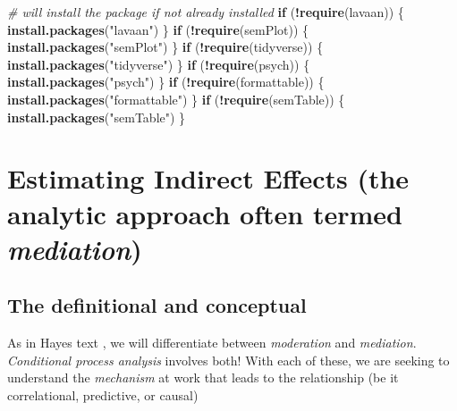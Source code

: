 \documentclass[
  11pt,
]{book}
\newenvironment{Shaded}{\begin{snugshade}}{\end{snugshade}}
\newcommand{\CommentTok}[1]{\textcolor[rgb]{0.37,0.37,0.37}{\textit{#1}}}
\newcommand{\ControlFlowTok}[1]{\textcolor[rgb]{0.27,0.27,0.27}{\textbf{#1}}}
\newcommand{\FunctionTok}[1]{\textcolor[rgb]{0.27,0.27,0.27}{\textbf{#1}}}
\newcommand{\NormalTok}[1]{#1}
\newcommand{\SpecialCharTok}[1]{\textcolor[rgb]{0.43,0.43,0.43}{\textbf{#1}}}
\newcommand{\StringTok}[1]{\textcolor[rgb]{0.5,0.5,0.5}{#1}}
\begin{document}
\begin{Shaded}
\begin{Highlighting}[]
\CommentTok{\# will install the package if not already installed}
\ControlFlowTok{if}\NormalTok{ (}\SpecialCharTok{!}\FunctionTok{require}\NormalTok{(lavaan)) \{}
    \FunctionTok{install.packages}\NormalTok{(}\StringTok{"lavaan"}\NormalTok{)}
\NormalTok{\}}
\ControlFlowTok{if}\NormalTok{ (}\SpecialCharTok{!}\FunctionTok{require}\NormalTok{(semPlot)) \{}
    \FunctionTok{install.packages}\NormalTok{(}\StringTok{"semPlot"}\NormalTok{)}
\NormalTok{\}}
\ControlFlowTok{if}\NormalTok{ (}\SpecialCharTok{!}\FunctionTok{require}\NormalTok{(tidyverse)) \{}
    \FunctionTok{install.packages}\NormalTok{(}\StringTok{"tidyverse"}\NormalTok{)}
\NormalTok{\}}
\ControlFlowTok{if}\NormalTok{ (}\SpecialCharTok{!}\FunctionTok{require}\NormalTok{(psych)) \{}
    \FunctionTok{install.packages}\NormalTok{(}\StringTok{"psych"}\NormalTok{)}
\NormalTok{\}}
\ControlFlowTok{if}\NormalTok{ (}\SpecialCharTok{!}\FunctionTok{require}\NormalTok{(formattable)) \{}
    \FunctionTok{install.packages}\NormalTok{(}\StringTok{"formattable"}\NormalTok{)}
\NormalTok{\}}
\ControlFlowTok{if}\NormalTok{ (}\SpecialCharTok{!}\FunctionTok{require}\NormalTok{(semTable)) \{}
    \FunctionTok{install.packages}\NormalTok{(}\StringTok{"semTable"}\NormalTok{)}
\NormalTok{\}}
\end{Highlighting}
\end{Shaded}

\hypertarget{estimating-indirect-effects-the-analytic-approach-often-termed-mediation}{%
\section{\texorpdfstring{Estimating Indirect Effects (the analytic approach often termed \emph{mediation})}{Estimating Indirect Effects (the analytic approach often termed mediation)}}\label{estimating-indirect-effects-the-analytic-approach-often-termed-mediation}}

\hypertarget{the-definitional-and-conceptual}{%
\subsection{The definitional and conceptual}\label{the-definitional-and-conceptual}}

As in Hayes text \citeyearpar{hayes_introduction_2018}, we will differentiate between \emph{moderation} and \emph{mediation}. \emph{Conditional process analysis} involves both! With each of these, we are seeking to understand the \emph{mechanism} at work that leads to the relationship (be it correlational, predictive, or causal)
\end{document}
